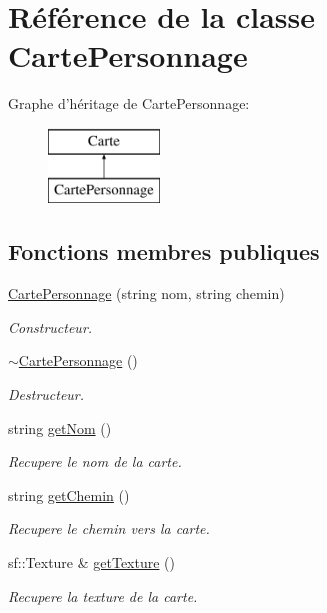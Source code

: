 \hypertarget{classCartePersonnage}{\section{\-Référence de la classe \-Carte\-Personnage}
\label{classCartePersonnage}
}
\-Graphe d'héritage de \-Carte\-Personnage\-:\begin{figure}[H]
\begin{center}
\leavevmode
\includegraphics[height=2.000000cm]{classCartePersonnage}
\end{center}
\end{figure}
\subsection*{\-Fonctions membres publiques}
\begin{DoxyCompactItemize}
\item 
\hypertarget{classCartePersonnage_a3119bd945abe416b38e6c2df7265db89}{\hyperlink{classCartePersonnage_a3119bd945abe416b38e6c2df7265db89}{\-Carte\-Personnage} (string nom, string chemin)}\label{classCartePersonnage_a3119bd945abe416b38e6c2df7265db89}

\begin{DoxyCompactList}\small\item\em \-Constructeur. \end{DoxyCompactList}\item 
\hypertarget{classCartePersonnage_adb19d4fd57375b46b5187a927db951a5}{\hyperlink{classCartePersonnage_adb19d4fd57375b46b5187a927db951a5}{$\sim$\-Carte\-Personnage} ()}\label{classCartePersonnage_adb19d4fd57375b46b5187a927db951a5}

\begin{DoxyCompactList}\small\item\em \-Destructeur. \end{DoxyCompactList}\item 
string \hyperlink{classCartePersonnage_ab89bb1837aebcbe48e5356579523b695}{get\-Nom} ()
\begin{DoxyCompactList}\small\item\em \-Recupere le nom de la carte. \end{DoxyCompactList}\item 
string \hyperlink{classCartePersonnage_a7767678c9ba3703f8e17a4469309d77e}{get\-Chemin} ()
\begin{DoxyCompactList}\small\item\em \-Recupere le chemin vers la carte. \end{DoxyCompactList}\item 
sf\-::\-Texture \& \hyperlink{classCartePersonnage_a3ec927c067fff46b9ba8999d946c50e2}{get\-Texture} ()
\begin{DoxyCompactList}\small\item\em \-Recupere la texture de la carte. \end{DoxyCompactList}\end{DoxyCompactItemize}


